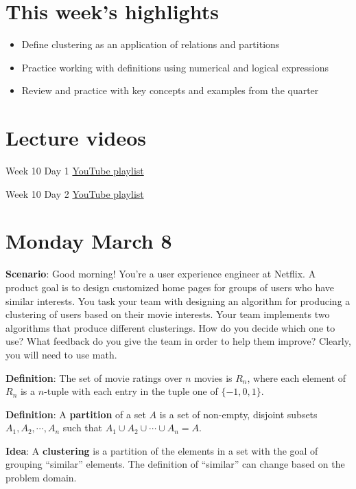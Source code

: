 \documentclass[12pt, oneside]{article}
\begin{document}
\begin{flushright}
\end{flushright}

\section*{This week's highlights}
\begin{itemize}
\item Define clustering as an application of relations and partitions
\item Practice working with definitions using numerical and logical expressions
\item Review and practice with key concepts and examples from the quarter
\end{itemize}

\section*{Lecture videos}
Week 10 Day 1
\href{https://youtube.com/playlist?list=PLML4QilACLk4q-3mP0sXZlUREJcqwNP5r}{YouTube playlist}

Week 10 Day 2
\href{https://youtube.com/playlist?list=PLML4QilACLk5f3EHde4cBpcA4p22v6297}{YouTube playlist}

\newpage
\section*{Monday March 8}


{\bf Scenario}: Good morning! You're a user experience engineer at Netflix. A
product goal is to design customized home pages for groups of users who have
similar interests. You task your team with designing an algorithm for
producing a clustering of users based on their movie interests. Your team
implements two algorithms that produce different clusterings. How do you
decide which one to use? What feedback do you give the team in order to help
them improve? Clearly, you will need to use math.

{\bf Definition}: The set of movie ratings over $n$ movies is $R_n$, where each element of $R_n$ is a $n$-tuple with each entry in the tuple one of $\{-1, 0, 1\}$.

{\bf Definition}: A {\bf partition} of a set $A$ is a set of non-empty, disjoint subsets $A_1, A_2, \cdots, A_n$ such that $A_1 \cup A_2 \cup \cdots \cup A_n = A$.

\vfill

{\bf Idea}: A {\bf clustering} is a partition of the elements in a set with the goal of grouping ``similar'' elements. The definition of ``similar'' can change based on the problem domain.
\end{document}
